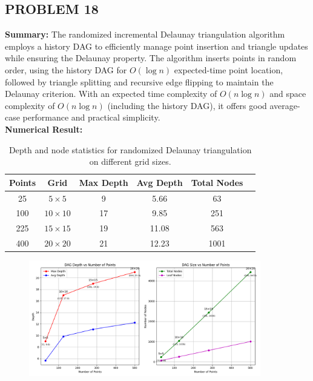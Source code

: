 \documentclass{article}
\begin{document}
\newpage

\subsection*{PROBLEM 18}

\textbf{Summary: }
The randomized incremental Delaunay triangulation algorithm employs a history DAG to efficiently manage point insertion and triangle updates while ensuring the Delaunay property. 
The algorithm inserts points in random order, using the history DAG for \(O(\log n)\) expected-time point location, followed by triangle splitting and recursive edge flipping to maintain the Delaunay criterion. 
With an expected time complexity of \(O(n \log n)\) and space complexity of \(O(n \log n)\) (including the history DAG), it offers good average-case performance and practical simplicity.
\\
\textbf{Numerical Result: }
\\
\begin{table}[h!]
    \centering
    \begin{tabular}{@{}cccccc@{}}
    \toprule
    \textbf{Points} & \textbf{Grid} & \textbf{Max Depth} & \textbf{Avg Depth} & \textbf{Total Nodes} \\ \midrule
    25  & \(5 \times 5\)   & 9 & 5.66 & 63  \\
    100 & \(10 \times 10\) & 17 & 9.85 & 251  \\
    225 & \(15 \times 15\) & 19 & 11.08 & 563  \\
    400 & \(20 \times 20\) & 21 & 12.23 & 1001 \\
    \end{tabular}
    \caption{Depth and node statistics for randomized Delaunay triangulation on different grid sizes.}
    \label{tab:numerical-results}
    \end{table}

\begin{figure}[h]
    \centering
    \includegraphics[width=0.9\textwidth]{Figure_1.png}
    \label{fig:model}
\end{figure}
\end{document}
